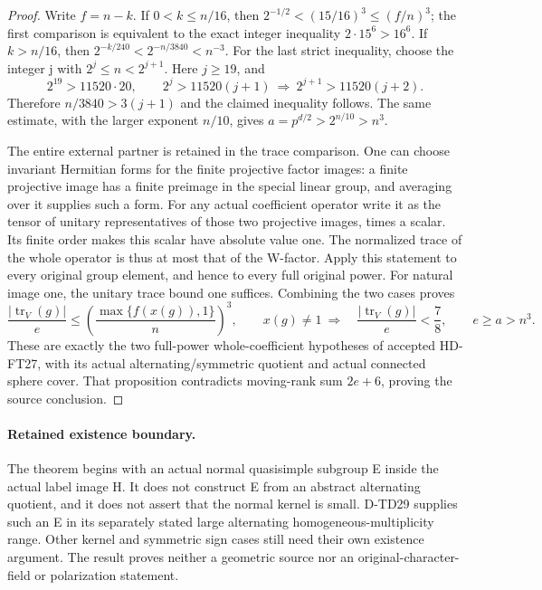 \begin{proof}
Write \(f=n-k\).  If \(0<k\le n/16\), then
\(2^{-1/2}<(15/16)^3\le(f/n)^3\); the first comparison is
equivalent to the exact integer inequality \(2\cdot15^6>16^6\).
If \(k>n/16\), then \(2^{-k/240}<2^{-n/3840}<n^{-3}\).
For the last strict inequality, choose the integer j with
\(2^j\le n<2^{j+1}\).  Here \(j\ge19\), and
\[
 2^{19}>11520\cdot20,\qquad
 2^j>11520(j+1)\ \Longrightarrow\
 2^{j+1}>11520(j+2).
 \tag{ANE.12}
\]
Therefore \(n/3840>3(j+1)\) and the claimed inequality follows.
The same estimate, with the larger exponent \(n/10\), gives
\(a=p^{d/2}>2^{n/10}>n^3\).

The entire external partner is retained in the trace comparison.
One can choose invariant Hermitian forms for the finite projective
factor images: a finite projective image has a finite preimage
in the special linear group, and averaging over it supplies such
a form.  For any actual coefficient operator write it as the
tensor of unitary representatives of those two projective images,
times a scalar.  Its finite order makes this scalar have absolute
value one.  The normalized trace of the whole operator is thus
at most that of the W-factor.  Apply this statement to every
original group element, and hence to every full original power.
For natural image one, the unitary trace bound one suffices.
Combining the two cases proves
\[
 \frac{|\operatorname{tr}_V(g)|}{e}
       \le\left(\frac{\max\{f(x(g)),1\}}n\right)^3,
 \qquad x(g)\ne1\ \Longrightarrow\quad
       \frac{|\operatorname{tr}_V(g)|}{e}<\frac78,
 \qquad e\ge a>n^3.
 \tag{ANE.13}
\]
These are exactly the two full-power whole-coefficient hypotheses
of accepted HD-FT27, with its actual alternating/symmetric quotient
and actual connected sphere cover.  That proposition contradicts
moving-rank sum \(2e+6\), proving the source conclusion.
\end{proof}

\paragraph{Retained existence boundary.}
The theorem begins with an actual normal quasisimple subgroup E
inside the actual label image H.  It does not construct E from
an abstract alternating quotient, and it does not assert that
the normal kernel is small.  D-TD29 supplies such an E in its
separately stated large alternating homogeneous-multiplicity
range.  Other kernel and symmetric sign cases still need their
own existence argument.  The result proves neither a geometric
source nor an original-character-field or polarization statement.
